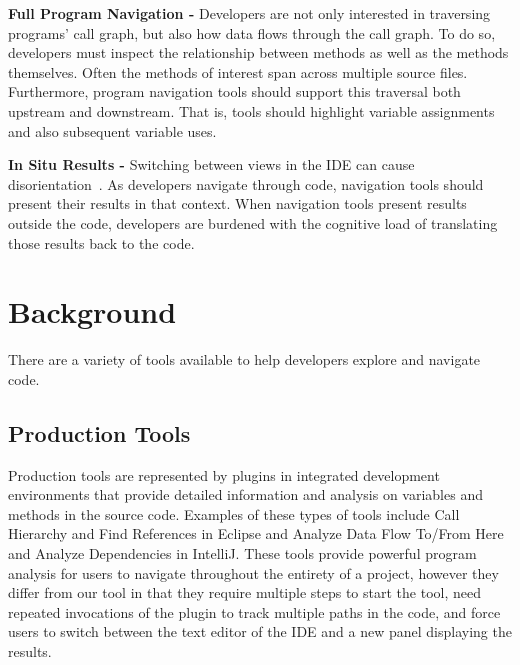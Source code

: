 \documentclass[conference]{IEEEtran}
\begin{document}
\vspace{1em} 
\noindent\textbf{Full Program Navigation -}
Developers are not only interested in traversing programs' call graph, but also how data flows through the call graph.
To do so, developers must inspect the relationship between methods as well as the methods themselves.
Often the methods of interest span across multiple source files.
Furthermore, program navigation tools should support this traversal both upstream and downstream. 
That is, tools should highlight variable assignments and also subsequent variable uses. 

\vspace{1em} 
\noindent\textbf{In Situ Results -}
Switching between views in the IDE can cause disorientation~\cite{deAlwis2006disorient}. As developers navigate through code, navigation tools should present their results in that context. 
When navigation tools present results outside the code, developers are burdened with the cognitive load of translating those results back to the code.

\section{Background}
There are a variety of tools available to help developers explore and navigate code.
\subsection{Production Tools}
Production tools are represented by plugins in integrated development environments that provide detailed information and analysis on variables and methods in the source code. Examples of these types of tools include Call Hierarchy and Find References in Eclipse\cite{Eclipse} and Analyze Data Flow To/From Here and Analyze Dependencies in IntelliJ\cite{IntelliJ}. These tools provide powerful program analysis for users to navigate throughout the entirety of a project, however they differ from our tool in that they require multiple steps to start the tool, need repeated invocations of the plugin to track multiple paths in the code, and force users to switch between the text editor of the IDE and a new panel displaying the results.
\end{document}
